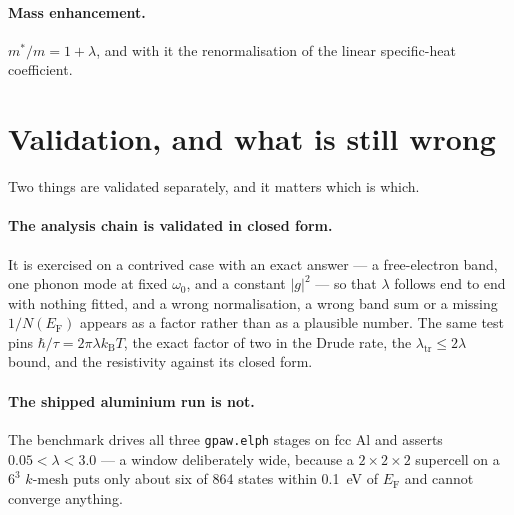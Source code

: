 \paragraph{Mass enhancement.} $m^*/m = 1 + \lambda$, and with it the
renormalisation of the linear specific-heat coefficient.

\section{Validation, and what is still wrong}

Two things are validated separately, and it matters which is which.

\paragraph{The analysis chain is validated in closed form.} It is exercised on
a contrived case with an exact answer --- a free-electron band, one phonon mode
at fixed $\omega_0$, and a constant $|g|^2$ --- so that $\lambda$ follows end to
end with nothing fitted, and a wrong normalisation, a wrong band sum or a
missing $1/N(E_\mathrm{F})$ appears as a factor rather than as a plausible
number. The same test pins $\hbar/\tau = 2\pi\lambda k_\mathrm{B}T$, the exact
factor of two in the Drude rate, the $\lambda_{\mathrm{tr}} \le 2\lambda$ bound,
and the resistivity against its closed form.

\paragraph{The shipped aluminium run is not.} The benchmark drives all three
\texttt{gpaw.elph} stages on fcc Al and asserts $0.05 < \lambda < 3.0$ --- a
window deliberately wide, because a $2\times2\times2$ supercell on a $6^3$
$k$-mesh puts only about six of 864 states within 0.1~eV of $E_\mathrm{F}$ and
cannot converge anything.


